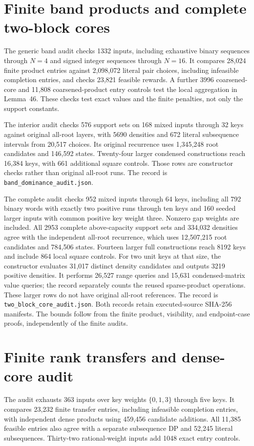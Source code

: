 \documentclass[11pt]{article}
\begin{document}
\clearpage
\section{Finite band products and complete two-block cores}
\label{app:two-block-core}
The generic band audit checks 1332 inputs, including exhaustive binary
sequences through $N=4$ and signed integer sequences through $N=16$.
It compares 28,024 finite product entries against 2,098,072 literal pair
choices, including infeasible completion entries, and checks 23,821
feasible rewards. A further 3996 coarsened-core and 11,808 coarsened-product
entry controls test the local aggregation in Lemma~46.
These checks test exact values and the finite penalties, not only the
support constants.

The interior audit checks 576 support sets on 168 mixed inputs through
32 keys against original all-root layers, with 5690 densities and 672
literal subsequence intervals from 20,517 choices. Its original recurrence
uses 1,345,248 root candidates and 146,592 states. Twenty-four larger
condensed constructions reach 16,384 keys, with 661 additional square
controls. Those rows are constructor checks rather than original all-root
runs. The record is \texttt{band\_dominance\_audit.json}.

The complete audit checks 952 mixed inputs through 64 keys, including
all 792 binary words with exactly two positive runs through ten keys and
160 seeded larger inputs with common positive key weight three. Nonzero
gap weights are included. All 2953 complete above-capacity support sets
and 334,032 densities agree with the independent all-root recurrence,
which uses 12,507,215 root candidates and 784,506 states.
Fourteen larger full constructions reach 8192 keys and include 864 local
square controls. For two unit keys at that size, the constructor evaluates
31,017 distinct density candidates and outputs 3219 positive densities.
It performs 26,527 range queries and 15,631 condensed-matrix value queries;
the record separately counts the reused sparse-product operations. These
larger rows do not have original all-root references. The record is
\texttt{two\_block\_core\_audit.json}. Both records retain executed-source
SHA-256 manifests. The bounds follow from the finite product, visibility,
and endpoint-case proofs, independently of the finite audits.


\clearpage
\section{Finite rank transfers and dense-core audit}
\label{app:rank-transfer}
The audit exhausts 363 inputs over key weights $\{0,1,3\}$ through five
keys. It compares 23,232 finite transfer entries, including infeasible
completion entries, with independent dense products using 459,456 candidate
additions. All 11,385 feasible entries also agree with a separate subsequence
DP and 52,245 literal subsequences. Thirty-two rational-weight inputs add
1048 exact entry controls.
\end{document}
